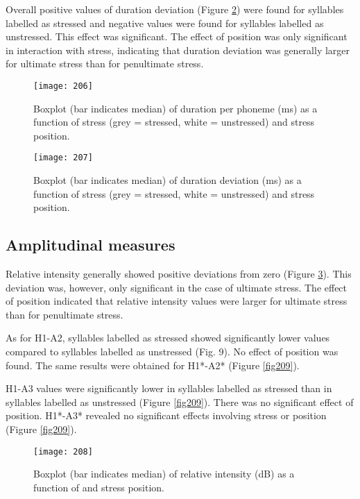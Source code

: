 Overall positive values of duration deviation (Figure \ref{fig207}) were found for syllables labelled as stressed and negative values were found for syllables labelled as unstressed. This effect was significant. The effect of position was only significant in interaction with stress, indicating that duration deviation was generally larger for ultimate stress than for penultimate stress. 

\begin{figure}
\texttt{[image: 206]}
\caption{Boxplot (bar indicates median) of duration per phoneme (ms) as a function of stress (grey = stressed,
white = unstressed) and stress position.}
\label{fig206}
\end{figure}

\begin{figure}
\texttt{[image: 207]}
\caption{Boxplot (bar indicates median) of duration deviation (ms) as a function of stress (grey = stressed,
white = unstressed) and stress position.}
\label{fig207}
\end{figure}

\subsection{Amplitudinal measures}
Relative intensity generally showed positive deviations from zero (Figure \ref{fig208}). This deviation was, however, only significant in the case of ultimate stress. The effect of position indicated that relative intensity values were larger for ultimate stress than for penultimate stress.\par

As for H1-A2, syllables labelled as stressed showed significantly lower values compared to syllables labelled as unstressed (Fig. 9). No effect of position was found. The same results were obtained for H1*-A2* (Figure \ref{fig209}). \par

H1-A3 values were significantly lower in syllables labelled as stressed than in syllables labelled as unstressed (Figure \ref{fig209}). There was no significant effect of position. H1*-A3* revealed no significant effects involving stress or position (Figure \ref{fig209}).

\begin{figure}
\texttt{[image: 208]}
\caption{Boxplot (bar indicates median) of relative intensity (dB) as a function of and stress position.}
\label{fig208}
\end{figure}

